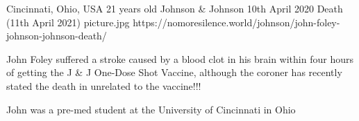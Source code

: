 {Cincinnati, Ohio, USA}
{21 years old}
{Johnson \& Johnson }
{10th April 2020}
{Death (11th April 2021)}
{picture.jpg}
{https://nomoresilence.world/johnson/john-foley-johnson-johnson-death/}
{

John Foley suffered a stroke caused by a blood clot in his brain within four
hours of getting the J \& J One-Dose Shot Vaccine, although the coroner has
recently stated the death in unrelated to the vaccine!!!

John was a pre-med student at the University of Cincinnati in Ohio

}
